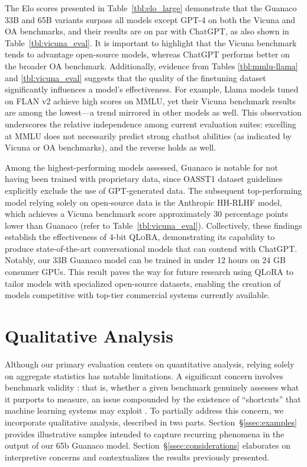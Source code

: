 The Elo scores presented in Table~\ref{tbl:elo_large} demonstrate that the {Guanaco} 33B and 65B variants surpass all models except GPT-4 on both the Vicuna and OA benchmarks, and their results are on par with ChatGPT, as also shown in Table~\ref{tbl:vicuna_eval}. It is important to highlight that the Vicuna benchmark tends to advantage open-source models, whereas ChatGPT performs better on the broader OA benchmark. Additionally, evidence from Tables \ref{tbl:mmlu-llama} and \ref{tbl:vicuna_eval} suggests that the quality of the finetuning dataset significantly influences a model's effectiveness. For example, Llama models tuned on FLAN v2 achieve high scores on MMLU, yet their Vicuna benchmark results are among the lowest—a trend mirrored in other models as well. This observation underscores the relative independence among current evaluation suites: excelling at MMLU does not necessarily predict strong chatbot abilities (as indicated by Vicuna or OA benchmarks), and the reverse holds as well.

Among the highest-performing models assessed, {Guanaco} is notable for not having been trained with proprietary data, since OASST1 dataset guidelines explicitly exclude the use of GPT-generated data. The subsequent top-performing model relying solely on open-source data is the Anthropic HH-RLHF model, which achieves a Vicuna benchmark score approximately 30 percentage points lower than {Guanaco} (refer to Table~\ref{tbl:vicuna_eval}). Collectively, these findings establish the effectiveness of 4-bit \textsc{QLoRA}, demonstrating its capability to produce state-of-the-art conversational models that can contend with ChatGPT. Notably, our 33B {Guanaco} model can be trained in under 12 hours on 24 GB consumer GPUs. This result paves the way for future research using \textsc{QLoRA} to tailor models with specialized open-source datasets, enabling the creation of models competitive with top-tier commercial systems currently available.

\section{Qualitative Analysis}

Although our primary evaluation centers on quantitative analysis, relying solely on aggregate statistics has notable limitations. A significant concern involves benchmark validity \citep{liao2021we}: that is, whether a given benchmark genuinely assesses what it purports to measure, an issue compounded by the existence of ``shortcuts'' that machine learning systems may exploit \citep{gururangan2018annotation, poliak2018hypothesis}. To partially address this concern, we incorporate qualitative analysis, described in two parts. Section~\S\ref{ssec:examples} provides illustrative samples intended to capture recurring phenomena in the output of our 65b {Guanaco} model. Section~\S\ref{ssec:considerations} elaborates on interpretive concerns and contextualizes the results previously presented.

